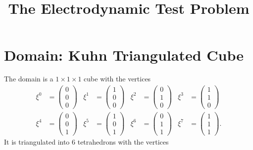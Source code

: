 \documentclass{scrartcl}
\begin{document}
\title{The Electrodynamic Test Problem}

\maketitle

\section{Domain: Kuhn Triangulated Cube}

The domain is a $1\times1\times1$ cube with the vertices
\begin{align}
  \xi^0&=\begin{pmatrix}0\\0\\0\end{pmatrix} &
  \xi^1&=\begin{pmatrix}1\\0\\0\end{pmatrix} &
  \xi^2&=\begin{pmatrix}0\\1\\0\end{pmatrix} &
  \xi^3&=\begin{pmatrix}1\\1\\0\end{pmatrix} \\
  \xi^4&=\begin{pmatrix}0\\0\\1\end{pmatrix} &
  \xi^5&=\begin{pmatrix}1\\0\\1\end{pmatrix} &
  \xi^6&=\begin{pmatrix}0\\1\\1\end{pmatrix} &
  \xi^7&=\begin{pmatrix}1\\1\\1\end{pmatrix}.
\end{align}
It is triangulated into 6 tetrahedrons with the vertices
\end{document}
